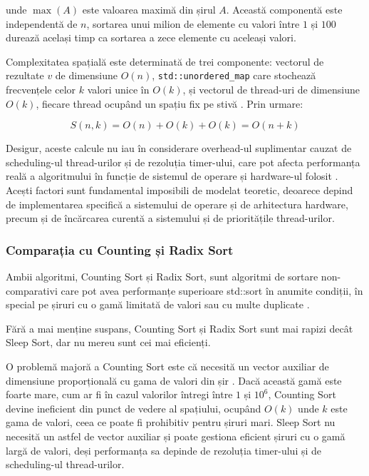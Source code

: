 \documentclass[9pt,a4paper,twocolumn,twoside]{rho-class/rho}
\begin{document}
unde $\max(A)$ este valoarea maximă din șirul $A$. Această 
componentă este independentă de $n$, sortarea unui milion de 
elemente cu valori între $1$ și $100$ durează același timp ca 
sortarea a zece elemente cu aceleași valori.

\par Complexitatea spațială este determinată de trei componente:
vectorul de rezultate $v$ de dimensiune $O(n)$, 
\texttt{std::unordered\_map} \cite{cppreference_map} care stochează 
frecvențele celor $k$ valori unice în $O(k)$, și vectorul de 
thread-uri de dimensiune $O(k)$, fiecare thread ocupând un spațiu 
fix pe stivă \cite{tanenbaum2014modern}. Prin urmare:

\begin{equation}
    S(n, k) = O(n) + O(k) + O(k) = O(n + k)
\end{equation}

Desigur, aceste calcule nu iau în considerare overhead-ul suplimentar cauzat de scheduling-ul thread-urilor și de rezoluția timer-ului, care pot afecta performanța reală a algoritmului în funcție de sistemul de operare și hardware-ul folosit \cite{microsoft_timers, tanenbaum2014modern}.
Acești factori sunt fundamental imposibili de modelat teoretic, deoarece depind de implementarea specifică a sistemului de operare și de arhitectura hardware, precum și de încărcarea curentă a sistemului și de prioritățile thread-urilor.


\subsubsection{Comparația cu Counting și Radix Sort}

Ambii algoritmi, Counting Sort și Radix Sort,
 sunt algoritmi de sortare non-comparativi care pot avea performanțe superioare std::sort în anumite condiții,
 în special pe șiruri cu o gamă limitată de valori sau cu multe duplicate \cite{knuth1998sorting}.

Fără a mai menține suspans, Counting Sort și Radix Sort sunt mai rapizi decât Sleep Sort, dar nu mereu sunt cei mai eficienți.

\par O problemă majoră a Counting Sort este că necesită un vector auxiliar de dimensiune proporțională cu gama de valori din șir \cite{knuth1998sorting}. 
Dacă această gamă este foarte mare, cum ar fi în cazul valorilor întregi între $1$ și $10^6$, Counting Sort devine ineficient din punct de vedere al spațiului, ocupând $O(k)$ unde $k$ este gama de valori, ceea ce poate fi prohibitiv pentru șiruri mari.
Sleep Sort nu necesită un astfel de vector auxiliar și poate gestiona eficient șiruri cu o gamă largă de valori, deși performanța sa depinde de rezoluția timer-ului și de scheduling-ul thread-urilor.
\end{document}
